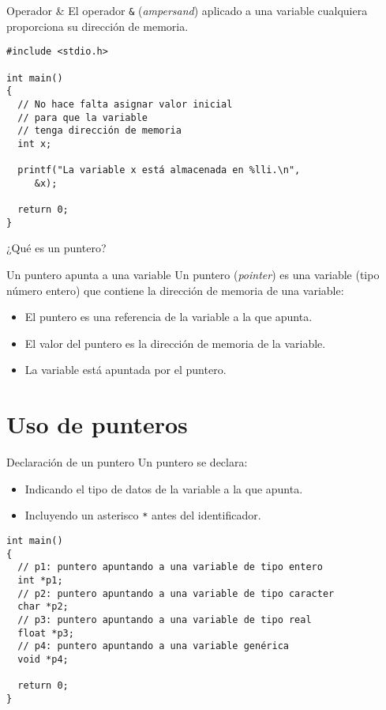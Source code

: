 \documentclass[xcolor={usenames,svgnames,dvipsnames}, aspectratio=169]{beamer}
\begin{document}
\begin{frame}[label={sec:org83a456c},fragile]{Operador \&}
 El operador \texttt{\&} (\emph{ampersand}) aplicado a una variable cualquiera proporciona su dirección de memoria.

\lstset{language=C,label= ,caption= ,captionpos=b,numbers=none}
\begin{lstlisting}
#include <stdio.h>

int main()
{
  // No hace falta asignar valor inicial
  // para que la variable
  // tenga dirección de memoria
  int x; 

  printf("La variable x está almacenada en %lli.\n",
	 &x);

  return 0;
}
\end{lstlisting}
\end{frame}

\begin{frame}[label={sec:org7b7f629}]{¿Qué es un puntero?}
\begin{block}{Un puntero apunta a una variable}
Un \alert{puntero} (\emph{pointer}) es una \alert{variable} (tipo número entero) que contiene la dirección de memoria de una variable: 

\begin{itemize}
\item El puntero es una referencia de la variable a la que apunta.

\item El valor del puntero es la dirección de memoria de la variable.

\item La variable está apuntada por el puntero.
\end{itemize}
\end{block}
\end{frame}

\section{Uso de punteros}
\label{sec:orgd74cc24}
\begin{frame}[label={sec:org4e464a5},fragile]{Declaración de un puntero}
 Un puntero se declara: 
\begin{itemize}
\item Indicando el tipo de datos de la variable a la que apunta.
\item Incluyendo un asterisco \texttt{*} antes del identificador.
\end{itemize}

\lstset{language=C,label= ,caption= ,captionpos=b,numbers=none}
\begin{lstlisting}
int main()
{
  // p1: puntero apuntando a una variable de tipo entero
  int *p1;
  // p2: puntero apuntando a una variable de tipo caracter
  char *p2;
  // p3: puntero apuntando a una variable de tipo real
  float *p3;
  // p4: puntero apuntando a una variable genérica
  void *p4;

  return 0;
}

\end{lstlisting}
\end{frame}
\end{document}
